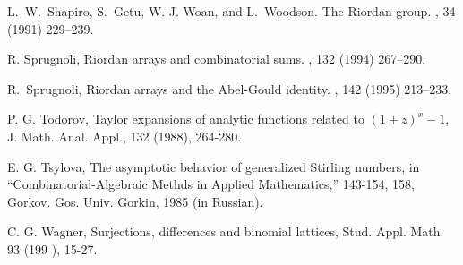 \begin{thebibliography}{100}
L.~W.~Shapiro, S.~Getu, W.-J. Woan, and L.~Woodson.
\newblock The Riordan group.
, 34 (1991) 229--239.

R. Sprugnoli,
\newblock Riordan arrays and combinatorial sums.
, 132 (1994) 267--290.

R.~Sprugnoli,
\newblock Riordan arrays and the Abel-Gould identity.
, 142 (1995) 213--233.

P. G. Todorov, Taylor expansions of analytic functions related to $(1+z)^x-1$, J. Math. Anal. Appl., 132 (1988), 264-280.

E. G. Tsylova, The asymptotic behavior of generalized Stirling numbers, in ``Combinatorial-Algebraic Methds in Applied Mathematics,'' 143-154, 158, Gorkov. Gos. Univ. Gorkin, 1985 (in Russian).

C. G. Wagner, Surjections, differences and binomial lattices, Stud. Appl. Math. 93 (199 ), 15-27.

\end{thebibliography}


